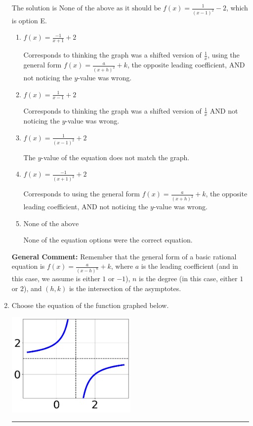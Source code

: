 \documentclass{extbook}[14pt]
\newcommand{\litem}[1]{\item #1

\rule{\textwidth}{0.4pt}}
\begin{document}
\begin{enumerate}
{The solution is \( \text{None of the above as it should be } f(x) = \frac{1}{(x - 1)^2} - 2 \), which is option E.\begin{enumerate}[label=\Alph*.]
\item \( f(x) = \frac{-1}{x + 1} + 2 \)

Corresponds to thinking the graph was a shifted version of $\frac{1}{x}$, using the general form $f(x) = \frac{a}{(x+h)^2}+k$, the opposite leading coefficient, AND not noticing the $y$-value was wrong.
\item \( f(x) = \frac{1}{x - 1} + 2 \)

Corresponds to thinking the graph was a shifted version of $\frac{1}{x}$ AND not noticing the $y$-value was wrong.
\item \( f(x) = \frac{1}{(x - 1)^2} + 2 \)

The $y$-value of the equation does not match the graph.
\item \( f(x) = \frac{-1}{(x + 1)^2} + 2 \)

Corresponds to using the general form $f(x) = \frac{a}{(x+h)^2}+k$, the opposite leading coefficient, AND not noticing the $y$-value was wrong.
\item \( \text{None of the above} \)

None of the equation options were the correct equation.
\end{enumerate}

\textbf{General Comment:} Remember that the general form of a basic rational equation is $ f(x) = \frac{a}{(x-h)^n} + k$, where $a$ is the leading coefficient (and in this case, we assume is either $1$ or $-1$), $n$ is the degree (in this case, either $1$ or $2$), and $(h, k)$ is the intersection of the asymptotes.
}
\litem{
Choose the equation of the function graphed below.

\begin{center}
    \includegraphics[width=0.5\textwidth]{../Figures/rationalGraphToEquationCopyC.png}
\end{center}


}
\end{enumerate}
\end{document}
